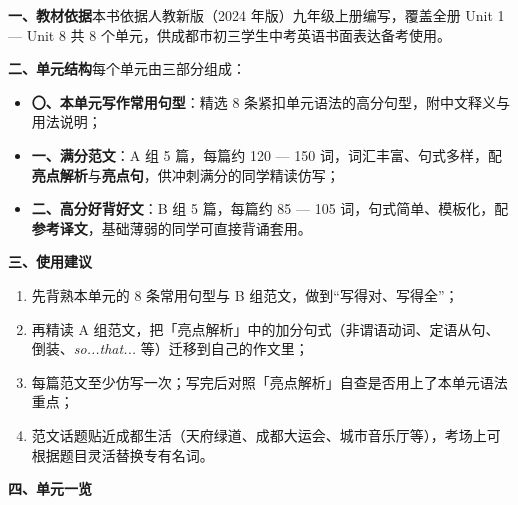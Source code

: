 \documentclass[UTF8,a4paper,11pt,oneside]{ctexbook}
\begin{document}
\noindent\textbf{一、教材依据}\quad 本书依据人教新版（2024 年版）九年级上册编写，覆盖全册
Unit 1 — Unit 8 共 8 个单元，供成都市初三学生中考英语书面表达备考使用。

\vspace{0.6em}
\noindent\textbf{二、单元结构}\quad 每个单元由三部分组成：
\begin{itemize}[leftmargin=2.2em,itemsep=0.25ex,topsep=0.35ex]
  \item \textbf{〇、本单元写作常用句型}：精选 8 条紧扣单元语法的高分句型，附中文释义与用法说明；
  \item \textbf{一、满分范文}：A 组 5 篇，每篇约 120 — 150 词，词汇丰富、句式多样，配\textbf{亮点解析}与\textbf{亮点句}，供冲刺满分的同学精读仿写；
  \item \textbf{二、高分好背好文}：B 组 5 篇，每篇约 85 — 105 词，句式简单、模板化，配\textbf{参考译文}，基础薄弱的同学可直接背诵套用。
\end{itemize}

\vspace{0.6em}
\noindent\textbf{三、使用建议}
\begin{enumerate}[leftmargin=2.2em,itemsep=0.25ex,topsep=0.35ex]
  \item 先背熟本单元的 8 条常用句型与 B 组范文，做到“写得对、写得全”；
  \item 再精读 A 组范文，把「亮点解析」中的加分句式（非谓语动词、定语从句、倒装、\textit{so...that...} 等）迁移到自己的作文里；
  \item 每篇范文至少仿写一次；写完后对照「亮点解析」自查是否用上了本单元语法重点；
  \item 范文话题贴近成都生活（天府绿道、成都大运会、城市音乐厅等），考场上可根据题目灵活替换专有名词。
\end{enumerate}

\clearpage
\vspace{0.2em}
\noindent\textbf{四、单元一览}
\end{document}
